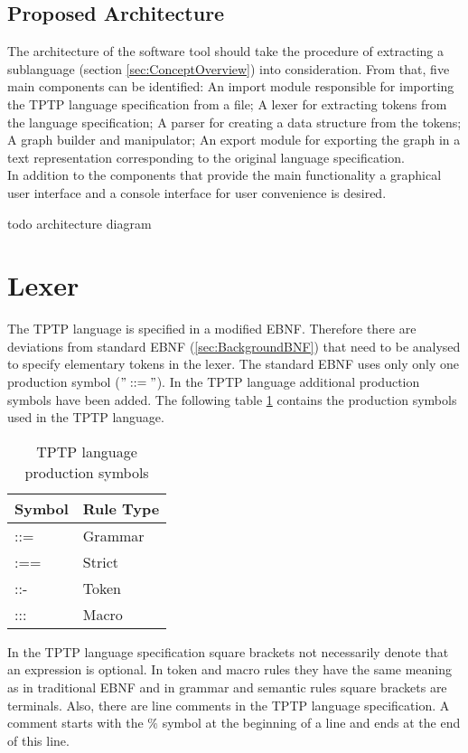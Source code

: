 \subsection{Proposed Architecture}\label{sec:ConceptProposedArchitecture}
The architecture of the software tool should take the procedure of extracting a sublanguage (section \ref{sec:ConceptOverview}) into consideration.
From that, five main components can be identified:
An import module responsible for importing the \ac{TPTP} language specification from a file;
A lexer for extracting tokens from the language specification; A parser for creating a data structure from the tokens;
A graph builder and manipulator;
An export module for exporting the graph in a text representation corresponding to the original language specification.\\
In addition to the components that provide the main functionality a graphical user interface and a console interface for user convenience is desired.

todo architecture diagram

\section{Lexer}

The \ac{TPTP} language is specified in a modified \ac{EBNF}.
Therefore there are deviations from standard \ac{EBNF} (\ref{sec:BackgroundBNF}) that need to be analysed to specify elementary tokens in the lexer.
The standard \ac{EBNF} uses only only one production symbol ($"::="$).
In the \ac{TPTP} language additional production symbols have been added.
The following table \ref{tbl:ConceptTPTPProductionSymbols} contains the production symbols used in the \ac{TPTP} language.

\begin{table}[H]
\centering
\renewcommand{\arraystretch}{1}
\caption{\ac{TPTP} language production symbols \cite{VS06}}
\begin{tabular}{ll}
\textbf{Symbol} & \textbf{Rule Type}\\\hline
::= & Grammar\\
:== & Strict\\
::- & Token\\
::: & Macro\\
\end{tabular}
\label{tbl:ConceptTPTPProductionSymbols}
\end{table}

In the \ac{TPTP} language specification square brackets not necessarily denote that an expression is optional.
In token and macro rules they have the same meaning as in traditional  \ac{EBNF} and in grammar and semantic rules square brackets are terminals.
Also, there are line comments in the \ac{TPTP} language specification. A comment starts with the $\%$ symbol at the beginning of a line and ends at the end of this line.



